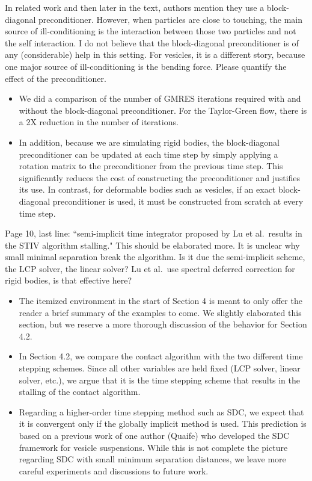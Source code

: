 \documentclass[11pt]{article}
\newcommand{\comment}[1]{{\color{blue} #1}}
\begin{document}
\noindent
\comment{In related work and then later in the text, authors mention
  they use a block-diagonal preconditioner. However, when particles are
  close to touching, the main source of ill-conditioning is the
  interaction between those two particles and not the self interaction.
  I do not believe that the block-diagonal preconditioner is of any
  (considerable) help in this setting.  For vesicles, it is a different
  story, because one major source of ill-conditioning is the bending
force.  Please quantify the effect of the preconditioner.}
\begin{itemize}
  \item We did a comparison of the number of GMRES iterations required
    with and without the block-diagonal preconditioner.  For the
    Taylor-Green flow, there is a 2X reduction in the number of
    iterations.

  \item In addition, because we are simulating rigid bodies, the
    block-diagonal preconditioner can be updated at each time step by
    simply applying a rotation matrix to the preconditioner from the
    previous time step.  This significantly reduces the cost of
    constructing the preconditioner and justifies its use.  In contrast,
    for deformable bodies such as vesicles, if an exact block-diagonal
    preconditioner is used, it must be constructed from scratch at every
    time step.
\end{itemize}

\noindent
\comment{Page 10, last line: ``semi-implicit time integrator proposed by
  Lu et al.~results in the STIV algorithm stalling." This should be
  elaborated more.  It is unclear why small minimal separation break the
  algorithm.  Is it due the semi-implicit scheme, the LCP solver, the
  linear solver?  Lu et al.~use spectral deferred correction for rigid
  bodies, is that effective here?}
\begin{itemize}
  \item The itemized environment in the start of Section 4 is meant to
    only offer the reader a brief summary of the examples to come.
    We slightly elaborated this section, but we reserve a more thorough
    discussion of the behavior for Section 4.2.

  \item In Section 4.2, we compare the contact algorithm with the two
    different time stepping schemes.  Since all other variables are held
    fixed (LCP solver, linear solver, etc.), we argue that it is the
    time stepping scheme that results in the stalling of the contact
    algorithm. 

  \item Regarding a higher-order time stepping method such as SDC, we
    expect that it is convergent only if the globally implicit method is
    used.  This prediction is based on a previous work of one author
    (Quaife) who developed the SDC framework for vesicle suspensions.
    While this is not complete the picture regarding SDC with small
    minimum separation distances, we leave more careful experiments and
    discussions to future work.

\end{itemize}
\end{document}
